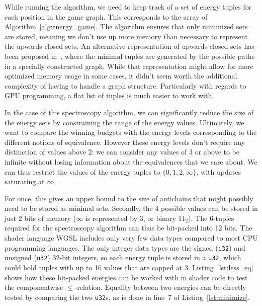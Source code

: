 While running the algorithm, we need to keep track of a set of energy tuples
for each position in the game graph.
This corresponds to the \Energies array of Algorithm~\ref{alg:energy_game}.
The algorithm ensures that only minimized sets are stored,
meaning we don't use up more memory than necessary to represent the
upwards-closed sets.
An alternative representation of upwards-closed sets has been proposed
in~\cite{Delzanno2000}, where the minimal tuples are generated by the possible
paths in a specially constructed graph.
While that representation might allow for more optimized memory usage in some cases,
it didn't seem worth the additional complexity of having to handle a graph structure.
Particularly with regards to GPU programming, a flat list of tuples is much
easier to work with.

In the case of this spectroscopy algorithm, we can significantly reduce the
size of the energy sets by constraining the range of the energy values.
Ultimately, we want to compare the winning budgets with the energy levels
corresponding to the different notions of equivalence.
However these energy levels don't require any distinction of values above 2:
we can consider any values of 3 or above to be infinite without losing
information about the equivalences that we care about.
We can thus restrict the values of the energy tuples to $\{0, 1, 2, \infty\}$,
with updates saturating at $\infty$.

For once, this gives an upper bound to the size of antichains that might
possibly need to be stored as minimal sets.
Secondly, the 4 possible values can be stored in just 2 bits of memory
($\infty$ is represented by 3, or binary $11_2$).
The 6-tuples required for the spectroscopy algorithm can thus be bit-packed
into 12 bits.
The shader language WGSL includes only very few data types compared to most CPU
programming languages.
The only integer data types are the signed (\texttt{i32}) and unsigned
(\texttt{u32}) 32-bit integers,
so each energy tuple is stored in a \texttt{u32},
which could hold tuples with up to 16 values that are capped at 3.
Listing~\ref{lst:less_eq} shows how these bit-packed energies can
be worked with in shader code to test the componentwise $\leq$-relation.
Equality between two energies can be directly tested by comparing the two
\texttt{u32}s,
as is done in line~7 of Listing~\ref{lst:minimize}.


